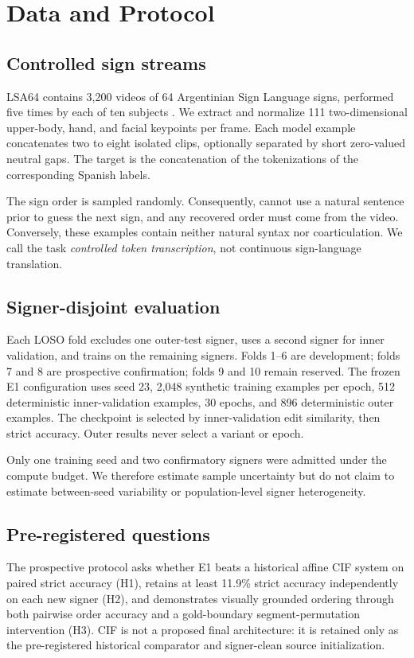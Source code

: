 \section{Data and Protocol}

\subsection{Controlled sign streams}

LSA64 contains 3,200 videos of 64 Argentinian Sign Language signs, performed five
times by each of ten subjects \citep{ronchetti2016lsa64}.  We extract and normalize
111 two-dimensional upper-body, hand, and facial keypoints per frame.  Each model
example concatenates two to eight isolated clips, optionally separated by short
zero-valued neutral gaps.  The target is the concatenation of the \Gemma{}
tokenizations of the corresponding Spanish labels.

The sign order is sampled randomly.  Consequently, \Gemma{} cannot use a natural
sentence prior to guess the next sign, and any recovered order must come from the
video.  Conversely, these examples contain neither natural syntax nor
coarticulation.  We call the task \emph{controlled token transcription}, not
continuous sign-language translation.

\subsection{Signer-disjoint evaluation}

Each LOSO fold excludes one outer-test signer, uses a second signer for inner
validation, and trains on the remaining signers.  Folds 1--6 are development;
folds 7 and 8 are prospective confirmation; folds 9 and 10 remain reserved.  The
frozen E1 configuration uses seed 23, 2,048 synthetic training examples per epoch,
512 deterministic inner-validation examples, 30 epochs, and 896 deterministic
outer examples.  The checkpoint is selected by inner-validation edit similarity,
then strict accuracy.  Outer results never select a variant or epoch.

Only one training seed and two confirmatory signers were admitted under the compute
budget.  We therefore estimate sample uncertainty but do not claim to estimate
between-seed variability or population-level signer heterogeneity.

\subsection{Pre-registered questions}

The prospective protocol asks whether E1 beats a historical affine CIF system on
paired strict accuracy (H1), retains at least 11.9\% strict accuracy independently
on each new signer (H2), and demonstrates visually grounded ordering through both
pairwise order accuracy and a gold-boundary segment-permutation intervention (H3).
CIF is not a proposed final architecture: it is retained only as the pre-registered
historical comparator and signer-clean source initialization.
